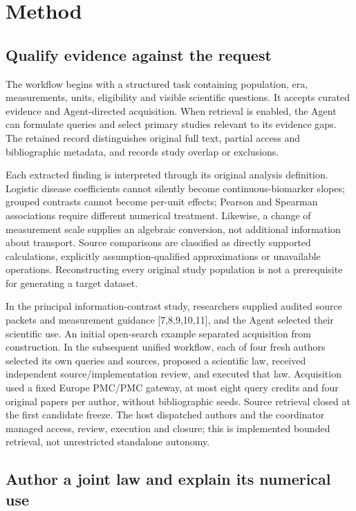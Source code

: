 \documentclass[10pt,twocolumn]{article}
\begin{document}
\section{Method}

\subsection{Qualify evidence against the request}

The workflow begins with a structured task containing population, era, measurements, units, eligibility and visible scientific questions. It accepts curated evidence and Agent-directed acquisition. When retrieval is enabled, the Agent can formulate queries and select primary studies relevant to its evidence gaps. The retained record distinguishes original full text, partial access and bibliographic metadata, and records study overlap or exclusions.


Each extracted finding is interpreted through its original analysis definition. Logistic disease coefficients cannot silently become continuous-biomarker slopes; grouped contrasts cannot become per-unit effects; Pearson and Spearman associations require different numerical treatment. Likewise, a change of measurement scale supplies an algebraic conversion, not additional information about transport. Source comparisons are classified as directly supported calculations, explicitly assumption-qualified approximations or unavailable operations. Reconstructing every original study population is not a prerequisite for generating a target dataset.


In the principal information-contrast study, researchers supplied audited source packets and measurement guidance [7,8,9,10,11], and the Agent selected their scientific use. An initial open-search example separated acquisition from construction. In the subsequent unified workflow, each of four fresh authors selected its own queries and sources, proposed a scientific law, received independent source/implementation review, and executed that law. Acquisition used a fixed Europe PMC/PMC gateway, at most eight query credits and four original papers per author, without bibliographic seeds. Source retrieval closed at the first candidate freeze. The host dispatched authors and the coordinator managed access, review, execution and closure; this is implemented bounded retrieval, not unrestricted standalone autonomy.


\subsection{Author a joint law and explain its numerical use}
\end{document}

